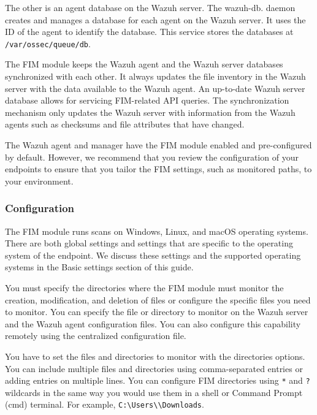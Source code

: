 The other is an agent database on the Wazuh server. The wazuh-db. daemon creates and manages a database for each agent on the Wazuh server. It uses the ID of the agent to identify the database. This service stores the databases at \texttt{/var/ossec/queue/db}.


The FIM module keeps the Wazuh agent and the Wazuh server databases synchronized with each other. It always updates the file inventory in the Wazuh server with the data available to the Wazuh agent. An up-to-date Wazuh server database allows for servicing FIM-related API queries. The synchronization mechanism only updates the Wazuh server with information from the Wazuh agents such as checksums and file attributes that have changed.

The Wazuh agent and manager have the FIM module enabled and pre-configured by default. However, we recommend that you review the configuration of your endpoints to ensure that you tailor the FIM settings, such as monitored paths, to your environment.

\subsubsection{Configuration}
The FIM module runs scans on Windows, Linux, and macOS operating systems. There are both global settings and settings that are specific to the operating system of the endpoint. We discuss these settings and the supported operating systems in the Basic settings section of this guide.

You must specify the directories where the FIM module must monitor the creation, modification, and deletion of files or configure the specific files you need to monitor. You can specify the file or directory to monitor on the Wazuh server and the Wazuh agent configuration files. You can also configure this capability remotely using the centralized configuration file.

You have to set the files and directories to monitor with the directories options. You can include multiple files and directories using comma-separated entries or adding entries on multiple lines. You can configure FIM directories using \texttt{*} and \texttt{?} wildcards in the same way you would use them in a shell or Command Prompt (cmd) terminal. For example, \texttt{C:\textbackslash Users\textbackslash *\textbackslash Downloads}.

